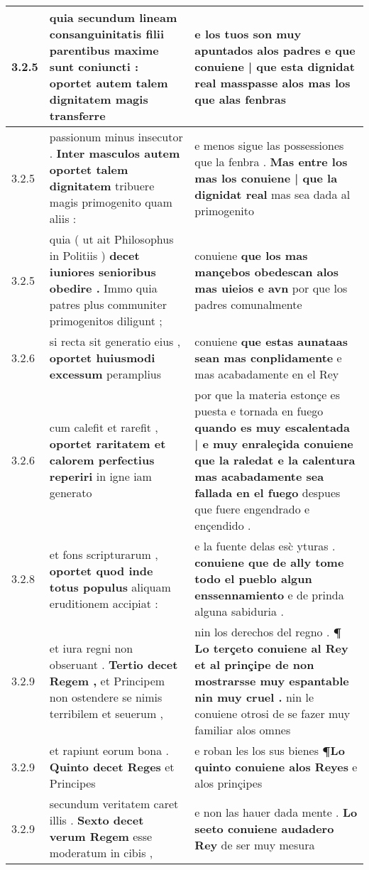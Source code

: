\begin{tabular}{|p{1cm}|p{6.5cm}|p{6.5cm}|}
3.2.5 & quia secundum lineam consanguinitatis filii parentibus maxime sunt coniuncti : \textbf{ oportet autem talem dignitatem } magis transferre & e los tuos son muy apuntados alos padres \textbf{ e que conuiene | que esta dignidat real masspasse alos } mas los que alas fenbras \\\hline
3.2.5 & passionum minus insecutor . \textbf{ Inter masculos autem oportet talem dignitatem } tribuere magis primogenito quam aliis : & e menos sigue las possessiones que la fenbra . \textbf{ Mas entre los mas los conuiene | que la dignidat real } mas sea dada al primogenito \\\hline
3.2.5 & quia ( ut ait Philosophus in Politiis ) \textbf{ decet iuniores senioribus obedire . } Immo quia patres plus communiter primogenitos diligunt ; & conuiene \textbf{ que los mas mançebos obedescan alos mas uieios e avn } por que los padres comunalmente \\\hline
3.2.6 & si recta sit generatio eius , \textbf{ oportet huiusmodi excessum } peramplius & conuiene \textbf{ que estas aunataas sean mas conplidamente } e mas acabadamente en el Rey \\\hline
3.2.6 & cum calefit et rarefit , \textbf{ oportet raritatem et calorem perfectius reperiri } in igne iam generato & por que la materia estonçe es puesta e tornada en fuego \textbf{ quando es muy escalentada | e muy enraleçida conuiene que la raledat e la calentura mas acabadamente sea fallada en el fuego } despues que fuere engendrado e ençendido . \\\hline
3.2.8 & et fons scripturarum , \textbf{ oportet quod inde totus populus } aliquam eruditionem accipiat : & e la fuente delas esc̀ yturas . \textbf{ conuiene que de ally tome todo el pueblo algun enssennamiento } e de prinda alguna sabiduria . \\\hline
3.2.9 & et iura regni non obseruant . \textbf{ Tertio decet Regem , } et Principem non ostendere se nimis terribilem et seuerum , & nin los derechos del regno . \textbf{ ¶ Lo terçeto conuiene al Rey et al prinçipe de non mostrarsse muy espantable nin muy cruel . } nin le conuiene otrosi de se fazer muy familiar alos omnes \\\hline
3.2.9 & et rapiunt eorum bona . \textbf{ Quinto decet Reges } et Principes & e roban les los sus bienes \textbf{ ¶Lo quinto conuiene alos Reyes } e alos prinçipes \\\hline
3.2.9 & secundum veritatem caret illis . \textbf{ Sexto decet verum Regem } esse moderatum in cibis , & e non las hauer dada mente . \textbf{ Lo seeto conuiene audadero Rey } de ser muy mesura \\\hline

\end{tabular}
